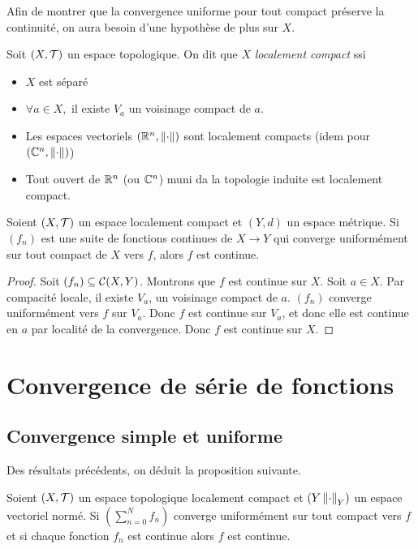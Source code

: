 Afin de montrer que la convergence uniforme pour tout compact préserve la continuité, on aura besoin d'une hypothèse de plus sur $X$.
\begin{definition}
    Soit $(X,\mathcal{T})$ un espace topologique. On dit que $X$ \emph{localement compact} ssi \begin{itemize}
        \item $X$ est séparé
        \item $\forall a\in X,$ il existe $V_a$ un voisinage compact de $a$.
    \end{itemize}
\end{definition}
\begin{remarque}
    \begin{itemize}
        \item Les espaces vectoriels $(\mathbb{R}^n,\left\| \cdot \right\|)$ sont localement compacts (idem pour $(\mathbb{C}^n,\left\| \cdot \right\|)$)
        \item Tout ouvert de $\mathbb{R}^n$ (ou $\mathbb{C}^n$) muni da la topologie induite est localement compact.
    \end{itemize}
\end{remarque}
\begin{proposition}
    Soient $(X,\mathcal{T})$ un espace localement compact et $(Y,d)$ un espace métrique. Si $(f_n)$ est une suite de fonctions continues de $X\to Y$ qui converge uniformément sur tout compact de $X$ vers $f$, alors $f$ est continue.
\end{proposition}
\begin{proof}
    Soit $(f_n)\subseteq \mathcal{C}(X,Y)$. Montrons que $f$ est continue sur $X$. Soit $a\in X$. Par compacité locale, il existe $V_a$, un voisinage compact de $a$. $(f_n)$ converge uniformément vers $f$ sur $V_a$. Donc $f$ est continue sur $V_a$, et donc elle est continue en $a$ par localité de la convergence. Donc $f$ est continue sur $X$.
\end{proof}
\chapter{Convergence de série de fonctions}
\section{Convergence simple et uniforme}
Des résultats précédents, on déduit la proposition suivante.
\begin{proposition}
    Soient $(X,\mathcal{T})$ un espace topologique localement compact et $(Y\left\| \cdot \right\|_Y)$ un espace vectoriel normé. Si $(\sum_{n=0}^Nf_n)$ converge uniformément sur tout compact vers $f$ et si chaque fonction $f_n$ est continue alors $f$ est continue.
\end{proposition}

